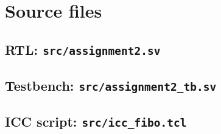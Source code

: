 \documentclass[11pt,a4paper]{article}
\begin{document}
\appendix
\section{Source files}
\subsection*{RTL: \texttt{src/assignment2.sv}}

\subsection*{Testbench: \texttt{src/assignment2\_tb.sv}}

\subsection*{ICC script: \texttt{src/icc\_fibo.tcl}}

\end{document}
